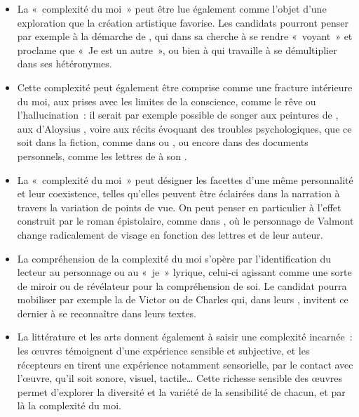 {\begin{itemize}
\item La «~complexité du moi~» peut être lue également comme l'objet d'une
exploration que la création artistique favorise. Les candidats pourront penser par
exemple à la démarche de , qui dans sa  cherche à se
rendre «~voyant~» et proclame que «~Je est un autre~», ou bien à  qui travaille
à se démultiplier dans ses hétéronymes.

\item Cette complexité peut également être comprise comme une fracture intérieure
du moi, aux prises avec les limites de la conscience, comme le rêve ou l'hallucination~:
il serait par exemple possible de songer aux peintures de , aux 
d'Aloysius , voire aux récits évoquant des troubles psychologiques, que ce
soit dans la fiction, comme dans  ou , ou encore dans des
documents personnels, comme les lettres de  à son .

\item La «~complexité du moi~» peut désigner les facettes d'une même personnalité
et leur coexistence, telles qu'elles peuvent être éclairées dans la narration à travers la
variation de points de vue. On peut penser en particulier à l'effet construit par le roman
épistolaire, comme dans , où le personnage de Valmont
change radicalement de visage en fonction des lettres et de leur auteur.

\item La compréhension de la complexité du moi s'opère par l'identification du
lecteur au personnage ou au «~je~» lyrique, celui-ci agissant comme une sorte de miroir
ou de révélateur pour la compréhension de soi. Le candidat pourra mobiliser par
exemple la  de Victor  ou de Charles  qui, dans leurs , invitent ce dernier à se reconnaître dans leurs textes.

\item La littérature et les arts donnent également à saisir une complexité incarnée~:
les œuvres témoignent d'une expérience sensible et subjective, et les récepteurs en
tirent une expérience notamment sensorielle, par le contact avec l'œuvre, qu'il soit
sonore, visuel, tactile… Cette richesse sensible des œuvres permet d'explorer la
diversité et la variété de la sensibilité de chacun, et par là la complexité du moi.
\end{itemize}}%
\vfill{~}\clearpage
